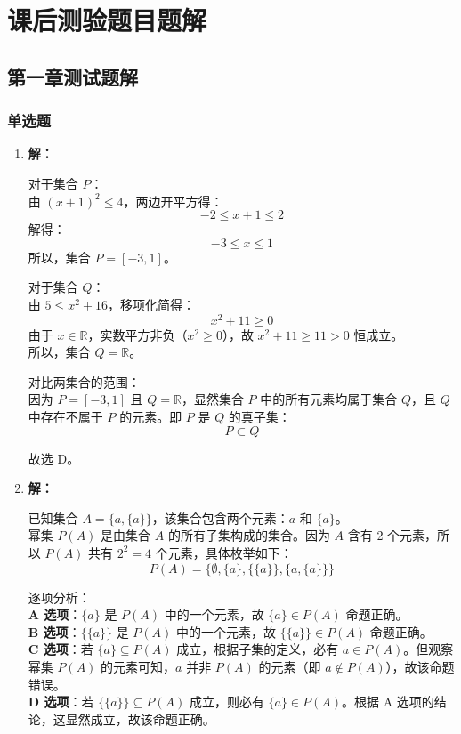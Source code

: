 \section{课后测验题目题解}

\subsection{第一章测试题解}

\subsubsection{单选题}

\begin{enumerate}
	\item \textbf{解：}
	
	对于集合 $P$：\\
	由 $(x+1)^2 \le 4$，两边开平方得：
	\[ -2 \le x+1 \le 2 \]
	解得：
	\[ -3 \le x \le 1 \]
	所以，集合 $P = [-3, 1]$。
	
	对于集合 $Q$：\\
	由 $5 \le x^2 + 16$，移项化简得：
	\[ x^2 + 11 \ge 0 \]
	由于 $x \in \mathbb{R}$，实数平方非负（$x^2 \ge 0$），故 $x^2 + 11 \ge 11 > 0$ 恒成立。\\
	所以，集合 $Q = \mathbb{R}$。
	
	对比两集合的范围：\\
	因为 $P = [-3, 1]$ 且 $Q = \mathbb{R}$，显然集合 $P$ 中的所有元素均属于集合 $Q$，且 $Q$ 中存在不属于 $P$ 的元素。即 $P$ 是 $Q$ 的真子集：
	\[ P \subset Q \]
	
	故选 D。
	
	\item \textbf{解：}
	
	已知集合 $A = \{a, \{a\}\}$，该集合包含两个元素：$a$ 和 $\{a\}$。\\
	幂集 $P(A)$ 是由集合 $A$ 的所有子集构成的集合。因为 $A$ 含有 2 个元素，所以 $P(A)$ 共有 $2^2 = 4$ 个元素，具体枚举如下：
	\[ P(A) = \{\emptyset, \{a\}, \{\{a\}\}, \{a, \{a\}\}\} \]
	
	逐项分析：\\
	\textbf{A 选项}：$\{a\}$ 是 $P(A)$ 中的一个元素，故 $\{a\} \in P(A)$ 命题正确。\\
	\textbf{B 选项}：$\{\{a\}\}$ 是 $P(A)$ 中的一个元素，故 $\{\{a\}\} \in P(A)$ 命题正确。\\
	\textbf{C 选项}：若 $\{a\} \subseteq P(A)$ 成立，根据子集的定义，必有 $a \in P(A)$。但观察幂集 $P(A)$ 的元素可知，$a$ 并非 $P(A)$ 的元素（即 $a \notin P(A)$），故该命题错误。\\
	\textbf{D 选项}：若 $\{\{a\}\} \subseteq P(A)$ 成立，则必有 $\{a\} \in P(A)$。根据 A 选项的结论，这显然成立，故该命题正确。
	

\end{enumerate}
